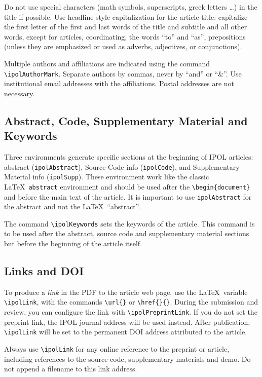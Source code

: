 \documentclass{ipol}
\begin{document}
Do not use special characters (math symbols, superscripts, greek
letters \ldots) in the title if possible. Use headline-style
capitalization for the article title: capitalize the first letter of
the first and last words of the title and subtitle and all other
words, except for articles, coordinating, the words ``to'' and ``as'',
prepositions (unless they are emphasized or used as adverbs,
adjectives, or conjunctions).

Multiple authors and affiliations are indicated using the command
\verb|\ipolAuthorMark|. Separate authors by commas, never by ``and''
or ``\&''. Use institutional email addresses with the
affiliations. Postal addresses are not necessary.

\subsection{Abstract, Code, Supplementary Material and Keywords}

Three environments generate specific sections at the beginning of IPOL
articles: abstract (\verb|ipolAbstract|), Source Code info
(\verb|ipolCode|), and Supplementary Material info
(\verb|ipolSupp|). These environment work like the classic
\LaTeX\ \verb|abstract| environment and should be used after the
\verb|\begin{document}| and before the main text of the article.
It is important to use \verb|ipolAbstract| for the abstract and
not the \LaTeX\ ``abstract''.

The command \verb|\ipolKeywords| sets the keywords of the article.
This command is to be used after the abstract, source code and
supplementary material sections but before the beginning of the
article itself.

\subsection{Links and DOI}

To produce a \emph{link} in the PDF to the article web page, use the
\LaTeX\ variable \verb|\ipolLink|, with the commands \verb|\url{}| or
\verb|\href{}{}|. During the submission and review, you can configure
the link with \verb|\ipolPreprintLink|. If you do not set the preprint
link, the IPOL journal address will be used instead. After publication,
\verb|\ipolLink| will be set to the permanent DOI address attributed
to the article.

Always use \verb|\ipolLink| for any online reference to the preprint
or article, including references to the source code, supplementary
materials and demo. Do not append a filename to this link address.
\end{document}
